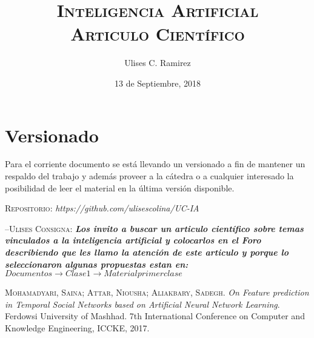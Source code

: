 \documentclass{article}
\title{\textsc{Inteligencia Artificial\\Articulo Cient\'ifico}}
\author{Ulises C. Ramirez}
\date{13 de Septiembre, 2018}
\begin{document}
\maketitle
{}
\newpage
\section*{Versionado}
Para el corriente documento se est\'a llevando un versionado a fin de mantener un respaldo del trabajo y adem\'as proveer a la c\'atedra o a cualquier interesado la posibilidad de leer el material en la \'ultima versi\'on disponible.\\

\begin{center}
  \textsc{Repositorio}: \textit{https://github.com/ulisescolina/UC-IA}
\end{center}

\hfill--\textsc{Ulises}
\newpage
\textsc{Consigna}: \textit{\textbf{Los invito a buscar un articulo científico sobre temas vinculados a la inteligencia artificial y colocarlos en el Foro describiendo que les llamo la atención de este articulo y porque lo seleccionaron algunas propuestas estan en: $Documentos \rightarrow Clase1 \rightarrow Material primer clase$}}



\begin{thebibliography}{99}
	 \textsc{Mohamadyari, Saina; Attar, Niousha; Aliakbary, Sadegh}. \textit{On Feature prediction in Temporal Social Networks based on Artificial Neural Network Learning}. Ferdowsi University of Mashhad. 7th International Conference on Computer and Knowledge Engineering, ICCKE, 2017.
	\bibitem[]{}
\end{thebibliography}
\end{document}
